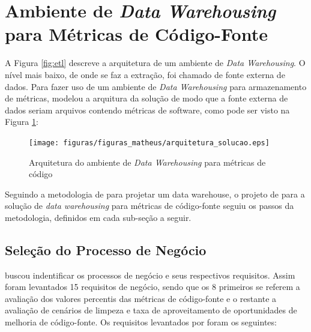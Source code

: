 \section{Ambiente de \textit{Data Warehousing} para Métricas de Código-Fonte}

A Figura \ref{fig:etl} descreve a arquitetura de um ambiente de \textit{Data Warehousing}. O nível mais baixo, de onde se faz a extração, foi chamado de fonte externa de dados. Para fazer uso de um ambiente de \textit{Data Warehousing} para armazenamento de métricas,  modelou a arquitura da solução de modo que a fonte externa de dados seriam arquivos contendo métricas de software, como pode ser visto na Figura \ref{fig:arquitetura_solucao}:

\begin{figure}[h!]
\centering
\texttt{[image: figuras/figuras\_matheus/arquitetura\_solucao.eps]}
\caption{Arquitetura do ambiente de \textit{Data Warehousing} para métricas de código}
\label{fig:arquitetura_solucao}
\end{figure}
\FloatBarrier

Seguindo a metodologia de  para projetar um data warehouse,  o projeto de  para a solução de \textit{data warehousing} para métricas de código-fonte seguiu os passos da metodologia, definidos em cada sub-seção a seguir.

\subsection{Seleção do Processo de Negócio}

 buscou indentificar os processos de negócio e seus respectivos requisitos. Assim foram levantados 15 requisitos de negócio, sendo que os 8 primeiros se referem a avaliação dos valores percentis das métricas de código-fonte e o restante a avaliação de cenários de limpeza e taxa de aproveitamento de oportunidades de melhoria de código-fonte. Os requisitos levantados por  foram os seguintes:


